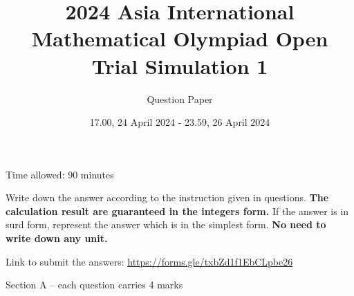 \documentclass[11pt]{scrartcl}
\title{2024 Asia International Mathematical Olympiad Open Trial Simulation 1}
\author{Question Paper}
\date{17.00, 24 April 2024 - 23.59, 26 April 2024}
\begin{document}
\maketitle
\begin{center}
    \Huge
\end{center}
\vspace{3cm}

\begin{flushright}
    \huge
   Time allowed: 90 minutes
\end{flushright}

\vspace{3cm}
\normalsize
Write down the answer according to the instruction given in questions. \textbf{The calculation result are guaranteed in the integers form.} If the answer is in surd form, represent the answer which is in the simplest form. \textbf{No need to write down any unit.}

\vspace{2cm}
Link to submit the answers: \url{https://forms.gle/txbZd1f1EbCLpbe26}

\pagestyle{plain}
\newpage
Section A – each question carries 4 marks

\hrulefill %
\end{document}
